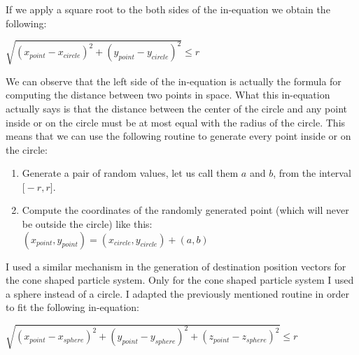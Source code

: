 \newpage
If we apply a square root to the both sides of the in-equation we obtain the following:

\begin{center}
	$\sqrt{(x_{point} - x_{circle}) ^ 2 + (y_{point} - y_{circle}) ^ 2} \le r$
\end{center}

We can observe that the left side of the in-equation is actually the formula for computing the distance between two points in space. What this in-equation actually says is that the distance between the center of the circle and any point inside or on the circle must be at most equal with the radius of the circle. This means that we can use the following routine to generate every point inside or on the circle:

\begin{enumerate}
	\item Generate a pair of random values, let us call them $a$ and $b$, from the interval $\big[-r, r\big]$.
	
	\item Compute the coordinates of the randomly generated point (which will never be outside the circle) like this:\\
	$(x_{point}, y_{point}) = (x_{circle}, y_{circle}) + (a, b)$
\end{enumerate}

I used a similar mechanism in the generation of destination position vectors for the cone shaped particle system. Only for the cone shaped particle system I used a sphere instead of a circle. I adapted the previously mentioned routine in order to fit the following in-equation:

\begin{center}
	$\sqrt{(x_{point} - x_{sphere}) ^ 2 + (y_{point} - y_{sphere}) ^ 2 + (z_{point} - z_{sphere}) ^ 2} \le r$
\end{center}